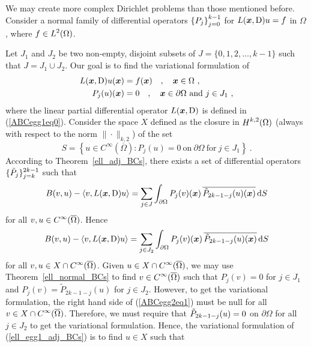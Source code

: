 \begin{egg}
We may create more complex Dirichlet problems than those mentioned
before.  Consider a normal family of differential operators 
$\displaystyle \left\{ P_j \right\}_{j=0}^{k-1}$ for
$L({\bm{x}},\operatorname{D})u = f$ in $\Omega$, where $\displaystyle f \in L^2(\Omega)$.

Let $J_1$ and $J_2$ be two non-empty, disjoint subsets of
$J=\{0,1,2,\ldots,k-1\}$ such that $J=J_1\cup J_2$.  Our goal is to
find the variational formulation of
\begin{equation} \label{ell_egg1_adj_BCs}
\begin{split}
L(\VEC{x},\diff)u(\VEC{x}) &= f(\VEC{x}) \quad , \quad \VEC{x} \in \Omega \ , \\
P_j(u)(\VEC{x}) &= 0 \quad , \quad \VEC{x} \in \partial \Omega \ \text{and}
\ j\in J_1 \ ,
\end{split}
\end{equation}
where the linear partial differential operator $L({\bm{x}},\operatorname{D})$ is
defined in (\ref{ABCegg1eq0}).
Consider the space $X$ defined as the closure in
$\displaystyle H^{k,2}(\Omega)$ (always
with respect to the norm $\|\cdot\|_{k,2}$) of the set
\[
S = \left\{ u \in C^\infty(\overline{\Omega}) : P_j(u) = 0 \ \text{on}
\ \partial \Omega \ \text{for} \ j\in J_1 \right\} \ .
\]
According to Theorem~\ref{ell_adj_BCs}, there exists a set of
differential operators $\displaystyle \{ \tilde{P}_j\}_{j=k}^{2k-1}$
such that
\[
B(v,u) - \left\langle{v} , {L({\bm{x}},\operatorname{D})u}\right\rangle =
\sum_{j\in J} \int_{\partial \Omega} P_j(v)({\bm{x}}) \,
\overline{\tilde{P}_{2k-1-j}(u)({\bm{x}})} \,\mathrm{d}{S}
\]
for all $\displaystyle v,u \in C^\infty(\overline{\Omega})$.
Hence
\begin{equation} \label{ABCegg2eq1}
B(v,u) - \left\langle{v} , {L({\bm{x}},\operatorname{D})u}\right\rangle =
\sum_{j\in J_2} \int_{\partial \Omega} P_j(v)({\bm{x}}) \,
\overline{\tilde{P}_{2k-1-j}(u)({\bm{x}})} \,\mathrm{d}{S}
\end{equation}
for all $\displaystyle v,u \in X \cap C^\infty(\overline{\Omega})$.
Given $\displaystyle u\in X \cap C^\infty(\overline{\Omega})$, we may use
Theorem~\ref{ell_normal_BCs} to find
$\displaystyle v \in C^\infty(\overline{\Omega})$ such that
$P_j(v)=0$ for $j\in J_1$ and $P_j(v) = \tilde{P}_{2k-1-j}(u)$ for $j\in J_2$.
However, to get the variational formulation, the right hand side of
(\ref{ABCegg2eq1}) must be null for all
$\displaystyle v\in X \cap C^\infty(\overline{\Omega})$.  Therefore,
we must require that $\displaystyle \tilde{P}_{2k-1-j}(u) = 0$ on
$\partial \Omega$ for all $j \in J_2$ to get the variational formulation.
Hence, the variational formulation of (\ref{ell_egg1_adj_BCs}) is to
find $u\in X$ such that

\end{egg}
